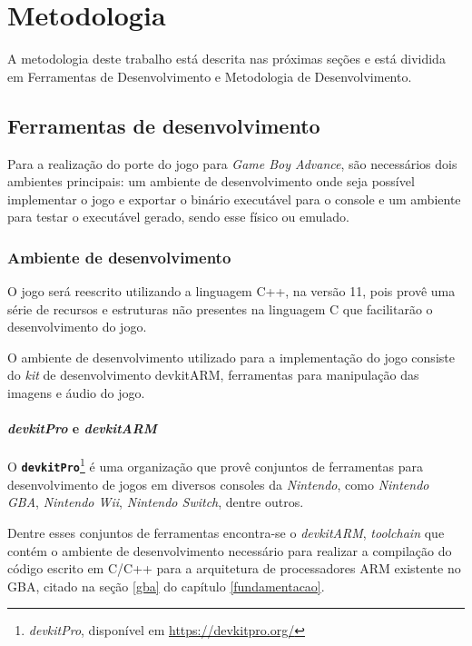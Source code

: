 \chapter[Metodologia]{Metodologia} \label{metodologia}

A metodologia deste trabalho está descrita nas próximas seções e está dividida em Ferramentas de Desenvolvimento e Metodologia de Desenvolvimento.

\section{Ferramentas de desenvolvimento}

  Para a realização do porte do jogo para \textit{Game Boy Advance}, são necessários dois ambientes principais: um ambiente de desenvolvimento onde seja possível implementar o jogo e exportar o binário executável para o console e um ambiente para testar o executável gerado, sendo esse físico ou emulado.

  \subsection{Ambiente de desenvolvimento}

    O jogo será reescrito utilizando a linguagem C++, na versão 11, pois provê uma série de recursos e estruturas não presentes na linguagem C que facilitarão o desenvolvimento do jogo.

    O ambiente de desenvolvimento utilizado para a implementação do jogo consiste do \textit{kit} de desenvolvimento devkitARM, ferramentas para manipulação das imagens e áudio do jogo.

    \subsubsection{\textit{devkitPro} e \textit{devkitARM}}

      O \texttt{\textbf{devkitPro}}\footnote{\textit{devkitPro}, disponível em \url{https://devkitpro.org/}} é uma organização que provê conjuntos de ferramentas para desenvolvimento de jogos em diversos consoles da \textit{Nintendo}, como \textit{Nintendo GBA}, \textit{Nintendo Wii}, \textit{Nintendo Switch}, dentre outros.

      Dentre esses conjuntos de ferramentas encontra-se o \textit{devkitARM}, \textit{toolchain} que contém o ambiente de desenvolvimento necessário para realizar a compilação do código escrito em C/C++ para a arquitetura de processadores ARM existente no GBA, citado na seção \ref{gba} do capítulo \ref{fundamentacao}.

